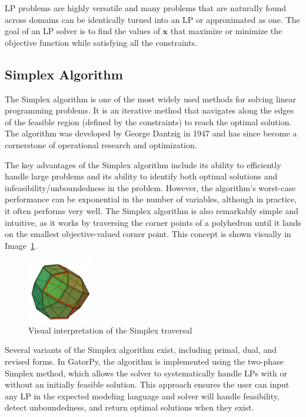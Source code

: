 \documentclass[conference]{IEEEtran}
\begin{document}
LP problems are highly versatile and many problems that are naturally found across domains can be identically turned into an LP or approximated as one.
The goal of an LP solver is to find the values of \(\mathbf{x}\) that maximize or minimize the objective function while satisfying all the constraints.

\subsection{Simplex Algorithm}

The Simplex algorithm is one of the most widely used methods for solving linear programming problems. 
It is an iterative method that navigates along the edges of the feasible region (defined by the constraints) to reach the optimal solution. 
The algorithm was developed by George Dantzig in 1947 and has since become a cornerstone of operational research and optimization.

The key advantages of the Simplex algorithm include its ability to efficiently handle large problems and its ability to identify both optimal solutions and infeasibility/unboundedness in the problem. 
However, the algorithm's worst-case performance can be exponential in the number of variables, although in practice, it often performs very well.
The Simplex algorithm is also remarkably simple and intuitive, as it works by traversing the corner points of a polyhedron until it lands on the smallest objective-valued corner point.
This concept is shown visually \cite{img:simplex} in Image~\ref{fig:simplex}.

\begin{figure}[htbp]
  \centerline{\includegraphics[width=0.25\textwidth]{images/simplex.png}}
  \caption{Visual interpretation of the Simplex traversal}
  \label{fig:simplex}
\end{figure}

Several variants of the Simplex algorithm exist, including primal, dual, and revised forms. 
In GatorPy, the algorithm is implemented using the two-phase Simplex method, which allows the solver to systematically handle LPs with or without an initially feasible solution. 
This approach ensures the user can input any LP in the expected modeling language and solver will handle feasibility, detect unboundedness, and return optimal solutions when they exist.
\end{document}
